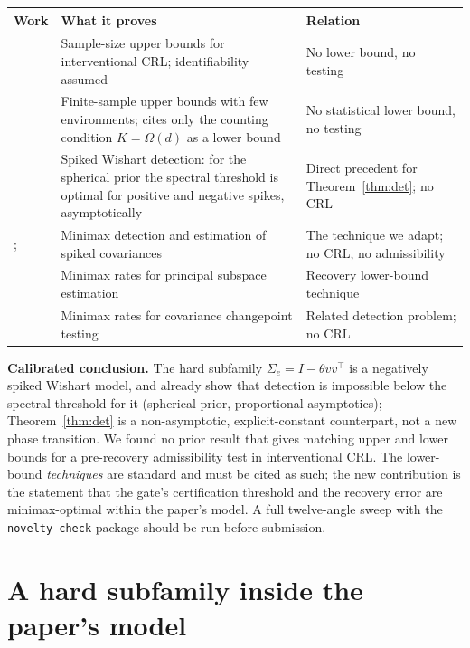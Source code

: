 \documentclass[11pt]{article}
\begin{document}
\begin{center}
\small
\begin{tabular}{p{4.4cm}p{6.4cm}p{3.4cm}}
\toprule
Work & What it proves & Relation \\
\midrule
\citet{acarturk2024sample} & Sample-size upper bounds for interventional CRL; identifiability assumed & No lower bound, no testing \\
\citet{lee2026beyond} & Finite-sample upper bounds with few environments; cites only the counting condition $K=\Omega(d)$ as a lower bound & No statistical lower bound, no testing \\
\citet{perry2018optimality} & Spiked Wishart detection: for the spherical prior the spectral threshold is optimal for positive and negative spikes, asymptotically & Direct precedent for Theorem~\ref{thm:det}; no CRL \\
\citet{berthet2013optimal}; \citet{cai2015optimal} & Minimax detection and estimation of spiked covariances & The technique we adapt; no CRL, no admissibility \\
\citet{vu2013minimax} & Minimax rates for principal subspace estimation & Recovery lower-bound technique \\
\citet{moen2024minimax} & Minimax rates for covariance changepoint testing & Related detection problem; no CRL \\
\bottomrule
\end{tabular}
\end{center}

\noindent\textbf{Calibrated conclusion.} The hard subfamily $\Sigma_e=I-\theta vv^\top$ is a negatively spiked Wishart model, and \citet{perry2018optimality} already show that detection is impossible below the spectral threshold for it (spherical prior, proportional asymptotics); Theorem~\ref{thm:det} is a non-asymptotic, explicit-constant counterpart, not a new phase transition. We found no prior result that gives matching upper and lower bounds for a pre-recovery admissibility test in interventional CRL. The lower-bound \emph{techniques} are standard and must be cited as such; the new contribution is the statement that the gate's certification threshold and the recovery error are minimax-optimal within the paper's model. A full twelve-angle sweep with the \texttt{novelty-check} package should be run before submission.

\section{A hard subfamily inside the paper's model}
\end{document}
